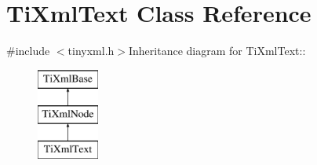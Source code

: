 \hypertarget{class_ti_xml_text}{
\section{TiXmlText Class Reference}
\label{class_ti_xml_text}
}


{\ttfamily \#include $<$tinyxml.h$>$}Inheritance diagram for TiXmlText::\begin{figure}[H]
\begin{center}
\leavevmode
\includegraphics[height=3cm]{class_ti_xml_text}
\end{center}
\end{figure}
